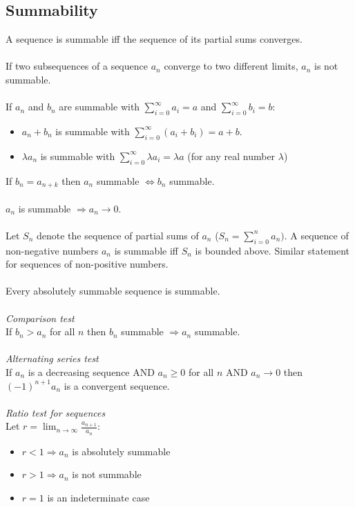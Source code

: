 \documentclass{article}
\begin{document}
\subsection{Summability}
A sequence is summable iff the sequence of its partial sums converges.
\\\\
If two subsequences of a sequence $ a_{n} $ converge to two different limits, $ a_{n} $ is not summable.
\\\\
If $ a_{n} $ and $ b_{n} $ are summable with $ \sum_{i = 0}^{\infty} a_{i} = a $ and $ \sum_{i = 0}^{\infty} b_{i} = b $:
\begin{itemize}
\item $ a_{n} + b_{n} $ is summable with $ \sum_{i = 0}^{\infty} (a_{i} + b_{i}) = a + b $.
\item $ \lambda a_{n} $ is summable with $ \sum_{i = 0}^{\infty} \lambda a_{i} = \lambda a $ (for any real number $ \lambda $)
\end{itemize}
If $ b_{n} = a_{n + k} $ then $ a_{n} $ summable $ \Leftrightarrow b_{n} $ summable.
\\\\
$ a_{n} $ is summable $ \Rightarrow a_{n} \to 0 $.
\\\\
Let $ S_{n} $ denote the sequence of partial sums of $ a_{n} $ ($ S_{n} = \sum_{i = 0}^{n} a_{n}) $. A sequence of non-negative numbers $ a_{n} $ is summable iff $ S_{n} $ is bounded above. Similar statement for sequences of non-positive numbers.
\\\\
Every absolutely summable sequence is summable.
\\\\
\textit{Comparison test}
\\
If $ b_{n} > a_{n} $ for all $ n $ then $ b_{n} $ summable $ \Rightarrow a_{n} $ summable.
\\\\
\textit{Alternating series test}
\\
If $ a_{n} $ is a decreasing sequence AND $ a_{n} \geq 0 $ for all $ n $ AND $ a_{n} \to 0 $ then $ (-1)^{n+1} a_{n} $ is a convergent sequence.
\\\\
\textit{Ratio test for sequences}
\\
Let $ r = \lim_{n \to \infty} \frac{a_{n + 1}}{a_{n}} $:
\begin{itemize}
\item $ r < 1 \Rightarrow a_{n} $ is absolutely summable
\item $ r > 1 \Rightarrow a_{n} $ is not summable
\item $ r = 1 $ is an indeterminate case
\end{itemize}
\end{document}
